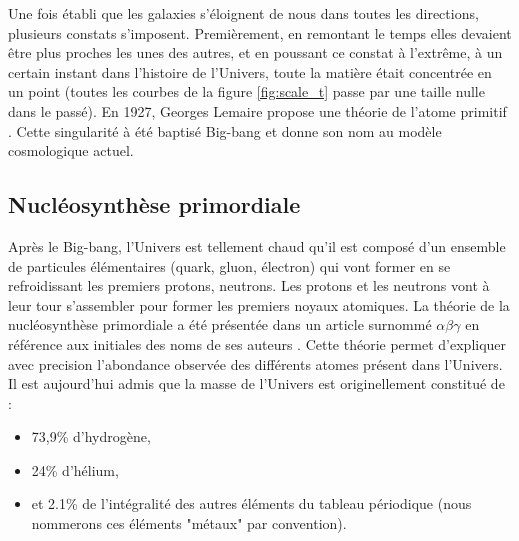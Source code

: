 Une fois établi que les galaxies s'éloignent de nous dans toutes les directions, plusieurs constats s'imposent.
Premièrement, en remontant le temps elles devaient être plus proches les unes des autres, et en poussant ce constat à l’extrême, à un certain instant dans l'histoire de l'Univers, toute la matière était concentrée en un point (toutes les courbes de la figure \ref{fig:scale_t} passe par une taille nulle dans le passé).
En 1927, Georges Lemaire propose une théorie de l'atome primitif \cite{1927ASSB...47...49L}.
Cette singularité à été baptisé Big-bang et donne son nom au modèle cosmologique actuel.

%

\subsection{Nucléosynthèse primordiale}
\label{sec:nucleosynthese_primordiale}
Après le Big-bang, l'Univers est tellement chaud qu'il est composé d'un ensemble de particules élémentaires (quark, gluon, électron) qui vont former en se refroidissant les premiers protons, neutrons.
Les protons et les neutrons vont à leur tour s'assembler pour former les premiers noyaux atomiques.
La théorie de la nucléosynthèse primordiale a été présentée dans un article surnommé $\alpha \beta \gamma$ en référence aux initiales des noms de ses auteurs \citep{PhysRev.73.803}.
Cette théorie permet d'expliquer avec precision l'abondance observée des différents atomes présent dans l'Univers.
Il est aujourd'hui admis que la masse de l'Univers est originellement constitué de : 

\begin{itemize}
\item 73,9\% d’hydrogène,
\item 24\% d’hélium,
\item et 2.1\% de l'intégralité des autres éléments du tableau périodique  (nous nommerons ces éléments "métaux" par convention).
\end{itemize}


